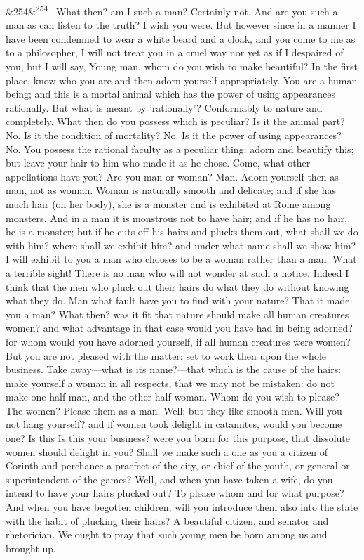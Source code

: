 \documentclass[12pt]{article}
\newcommand{\para}[1][]{\par\noindent\ifx&#1&\else\textsuperscript{\footnotesize #1}~\fi}
\begin{document}
\para[254] What then? am I such a man? Certainly not. And are you such a man as can listen to the truth? I wish you were. But however since in a manner I have been condemned to wear a white beard and a cloak, and you come to me as to a philosopher, I will not treat you in a cruel way nor yet as if I despaired of you, but I will say, Young man, whom do you wish to make beautiful? In the first place, know who you are and then adorn yourself appropriately. You are a human being; and this is a mortal animal which has the power of using appearances rationally. But what is meant by 'rationally'? Conformably to nature and completely. What then do you possess which is peculiar? Is it the animal part? No. Is it the condition of mortality? No. Is it the power of using appearances? No. You possess the rational faculty as a peculiar thing: adorn and beautify this; but leave your hair to him who made it as he chose. Come, what other appellations have you? Are you man or woman? Man. Adorn yourself then as man, not as woman. Woman is naturally smooth and delicate; and if she has much hair (on her body), she is a monster and is exhibited at Rome among monsters. And in a man it is monstrous not to have hair; and if he has no hair, he is a monster; but if he cuts off his hairs and plucks them out, what shall we do with him? where shall we exhibit him? and under what name shall we show him? I will exhibit to you a man who chooses to be a woman rather than a man. What a terrible sight! There is no man who will not wonder at such a notice. Indeed I think that the men who pluck out their hairs do what they do without knowing what they do. Man what fault have you to find with your nature? That it made you a man? What then? was it fit that nature should make all human creatures women? and what advantage in that case would you have had in being adorned? for whom would you have adorned yourself, if all human creatures were women? But you are not pleased with the matter: set to work then upon the whole business. Take away—what is its name?—that which is the cause of the hairs: make yourself a woman in all respects, that we may not be mistaken: do not make one half man, and the other half woman. Whom do you wish to please? The women? Please them as a man. Well; but they like smooth men. Will you not hang yourself? and if women took delight in catamites, would you become one? Is this Is this your business? were you born for this purpose, that dissolute women should delight in you? Shall we make such a one as you a citizen of Corinth and perchance a praefect of the city, or chief of the youth, or general or superintendent of the games? Well, and when you have taken a wife, do you intend to have your hairs plucked out? To please whom and for what purpose? And when you have begotten children, will you introduce them also into the state with the habit of plucking their hairs? A beautiful citizen, and senator and rhetorician. We ought to pray that such young men be born among us and brought up.
\end{document}

